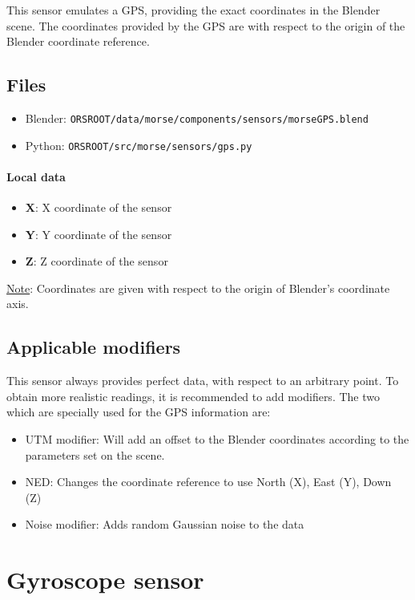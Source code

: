 \documentclass[twoside,a4paper,10pt]{report}
\newcommand{\dokutitlelevelone}[1]{\chapter{#1}}
\newcommand{\dokutitleleveltwo}[1]{\section{#1}}
\newcommand{\dokutitlelevelfour}[1]{\subsubsection{#1}}
\newcommand{\dokubold}[1]{\textbf{#1}}
\newcommand{\dokumonospace}[1]{\texttt{#1}}
\newcommand{\dokuunderline}[1]{\underline{#1}}
\newcommand{\dokuitem}{\item}
\begin{document}
This sensor emulates a GPS, providing the exact coordinates in the Blender scene. The coordinates provided by the GPS are with respect to the origin of the Blender coordinate reference.


\dokutitleleveltwo{Files}
\label{45b963397aa40d4a0063e0d85e4fe7a1}%

\begin{itemize}
\dokuitem  Blender: \dokumonospace{{\textdollar}ORS{\textunderscore}ROOT/data/morse/components/sensors/morse{\textunderscore}GPS.blend}
\dokuitem  Python: \dokumonospace{{\textdollar}ORS{\textunderscore}ROOT/src/morse/sensors/gps.py}
\end{itemize}

\dokutitlelevelfour{Local data}

\begin{itemize}
\dokuitem  \dokubold{X}: X coordinate of the sensor
\dokuitem  \dokubold{Y}: Y coordinate of the sensor
\dokuitem  \dokubold{Z}: Z coordinate of the sensor
\end{itemize}

\dokuunderline{Note}: Coordinates are given with respect to the origin of Blender's coordinate axis.


\dokutitleleveltwo{Applicable modifiers}
\label{e70c0c8fd69fbf29dc4de09110825004}%

This sensor always provides perfect data, with respect to an arbitrary point.
To obtain more realistic readings, it is recommended to add modifiers.
The two which are specially used for the GPS information are:



\begin{itemize}
\dokuitem  UTM modifier: Will add an offset to the Blender coordinates according to the parameters set on the scene.
\end{itemize}

\begin{itemize}
\dokuitem  NED: Changes the coordinate reference to use North (X), East (Y), Down (Z)
\end{itemize}

\begin{itemize}
\dokuitem  Noise modifier: Adds random Gaussian noise to the data
\end{itemize}

\dokutitlelevelone{Gyroscope sensor}
\label{85d7c1617c515754e4ff7f3604a0776f}%
\label{6b3b2d8500522343e080755f0e0aa4fe}%
\end{document}
